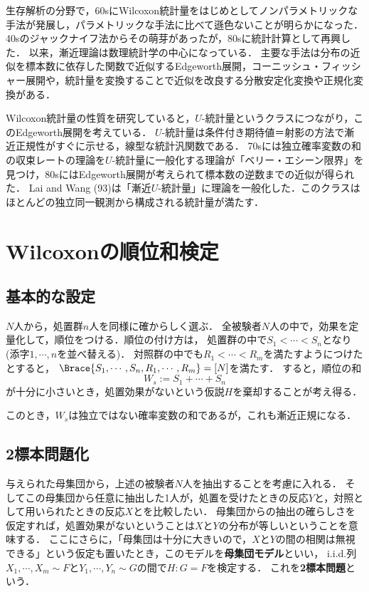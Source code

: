 \documentclass[uplatex,dvipdfmx]{jsreport}
\begin{document}
\begin{history}[漸近論]
    生存解析の分野で，60sにWilcoxon統計量をはじめとしてノンパラメトリックな手法が発展し，パラメトリックな手法に比べて遜色ないことが明らかになった．
    40sのジャックナイフ法からその萌芽があったが，80sに統計計算として再興した．
    以来，漸近理論は数理統計学の中心になっている．
    主要な手法は分布の近似を標本数に依存した関数で近似するEdgeworth展開，コーニッシュ・フィッシャー展開や，統計量を変換することで近似を改良する分散安定化変換や正規化変換がある．
\end{history}

\begin{history}[前園さんの研究]
    Wilcoxon統計量の性質を研究していると，$U$-統計量というクラスにつながり，このEdgeworth展開を考えている．
    $U$-統計量は条件付き期待値＝射影の方法で漸近正規性がすぐに示せる，線型な統計汎関数である．
    70sには独立確率変数の和の収束レートの理論を$U$-統計量に一般化する理論が「ベリー・エシーン限界」を見つけ，80sにはEdgeworth展開が考えられて標本数の逆数までの近似が得られた．
    Lai and Wang (93)は「漸近$U$-統計量」に理論を一般化した．このクラスはほとんどの独立同一観測から構成される統計量が満たす．
\end{history}

\section{Wilcoxonの順位和検定}

\subsection{基本的な設定}

$N$人から，処置群$n$人を同様に確からしく選ぶ．
全被験者$N$人の中で，効果を定量化して，順位をつける．順位の付け方は，
処置群の中で$S_1<\cdots<S_n$となり(添字$1,\cdots,n$を並べ替える)．
対照群の中でも$R_1<\cdots<R_m$を満たすようにつけたとすると，
$\Brace{S_1,\cdots,S_n,R_1,\cdots,R_m}=[N]$を満たす．
すると，順位の和
\[W_s:=S_1+\cdots+S_n\]
が十分に小さいとき，処置効果がないという仮説$H$を棄却することが考え得る．

このとき，$W_s$は独立ではない確率変数の和であるが，これも漸近正規になる．

\subsection{2標本問題化}

与えられた母集団から，上述の被験者$N$人を抽出することを考慮に入れる．
そしてこの母集団から任意に抽出した1人が，処置を受けたときの反応$Y$と，対照として用いられたときの反応$X$とを比較したい．
母集団からの抽出の確らしさを仮定すれば，処置効果がないということは$X$と$Y$の分布が等しいということを意味する．
ここにさらに，「母集団は十分に大きいので，$X$と$Y$の間の相関は無視できる」という仮定も置いたとき，このモデルを\textbf{母集団モデル}といい，
i.i.d.列$X_1,\cdots,X_m\sim F$と$Y_1,\cdots,Y_n\sim G$の間で$H:G=F$を検定する．
これを\textbf{2標本問題}という．
\end{document}
